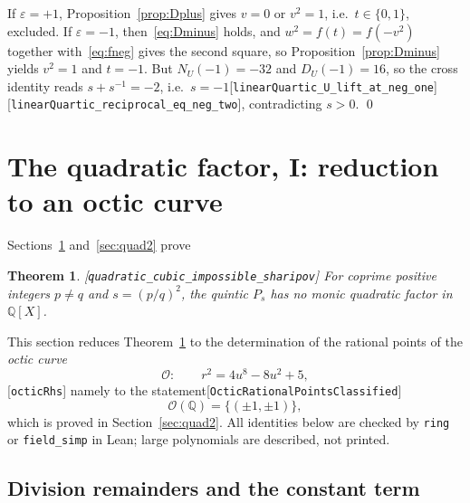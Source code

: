 \documentclass[10pt]{article}
\newtheorem{theorem}{Theorem}[section]
\theoremstyle{definition}
\theoremstyle{remark}
\newcommand{\Q}{\mathbb{Q}}
\newcommand{\leanref}[1]{{\scriptsize\textup{[\texttt{#1}]}}\allowbreak}
\begin{document}
If $\varepsilon=+1$, Proposition~\ref{prop:Dplus} gives $v=0$ or $v^2=1$,
i.e.\ $t\in\{0,1\}$, excluded.  If $\varepsilon=-1$, then~\eqref{eq:Dminus}
holds, and $w^2=f(t)=f(-v^2)$ together with~\eqref{eq:fneg} gives the second
square, so Proposition~\ref{prop:Dminus} yields $v^2=1$ and $t=-1$.  But
$N_U(-1)=-32$ and $D_U(-1)=16$, so the cross identity reads $s+s^{-1}=-2$,
i.e.\ $s=-1$\leanref{linear\allowbreak Quartic\_\allowbreak U\_\allowbreak lift\_\allowbreak at\_\allowbreak neg\_\allowbreak one} \leanref{linear\allowbreak Quartic\_\allowbreak reciprocal\_\allowbreak eq\_\allowbreak neg\_\allowbreak two},
contradicting $s>0$. \qed
\section{The quadratic factor, I: reduction to an octic curve}\label{sec:quad1}

Sections~\ref{sec:quad1} and~\ref{sec:quad2} prove
\begin{theorem}\label{thm:quad}
\leanref{quadratic\_\allowbreak cubic\_\allowbreak impossible\_\allowbreak sharipov}
For coprime positive integers $p\ne q$ and $s=(p/q)^2$, the quintic $P_s$ has
no monic quadratic factor in $\Q[X]$.
\end{theorem}
This section reduces Theorem~\ref{thm:quad} to the determination of the
rational points of the \emph{octic curve}
\begin{equation}\label{eq:octic}
 \mathcal{O}:\qquad r^2=4u^8-8u^2+5 ,
\end{equation}
\leanref{octic\allowbreak Rhs}
namely to the statement\leanref{Octic\allowbreak Rational\allowbreak Points\allowbreak Classified}
\begin{equation}\label{eq:octic-class}
 \mathcal{O}(\Q)=\{(\pm1,\pm1)\},
\end{equation}
which is proved in Section~\ref{sec:quad2}.  All identities below are checked
by \texttt{ring} or \texttt{field\_\allowbreak simp} in Lean; large polynomials are
described, not printed.

\subsection{Division remainders and the constant term}
\end{document}
